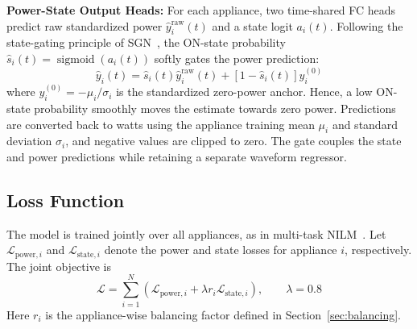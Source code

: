 \documentclass[journal]{IEEEtran}
\begin{document}
\textbf{Power-State Output Heads:}
For each appliance, two time-shared FC heads predict raw standardized power $\hat y_i^{\mathrm{raw}}(t)$ and a state logit $a_i(t)$. Following the state-gating principle of SGN~\cite{shin2019sgn}, the ON-state probability $\hat s_i(t)=\operatorname{sigmoid}(a_i(t))$ softly gates the power prediction:
\begin{equation}
\hat y_i(t)=\hat s_i(t)\hat y_i^{\mathrm{raw}}(t)
+[1-\hat s_i(t)]y_i^{(0)}
\label{eq:soft-power-gate}
\end{equation}
where $y_i^{(0)}=-\mu_i/\sigma_i$ is the standardized zero-power anchor. Hence, a low ON-state probability smoothly moves the estimate towards zero power. Predictions are converted back to watts using the appliance training mean $\mu_i$ and standard deviation $\sigma_i$, and negative values are clipped to zero. The gate couples the state and power predictions while retaining a separate waveform regressor.

\subsection{Loss Function}
\label{sec:loss}

The model is trained jointly over all appliances, as in multi-task NILM~\cite{faustine2020unet,xiong2024matnilm,sun2025transfer}. Let $\mathcal{L}_{\mathrm{power},i}$ and $\mathcal{L}_{\mathrm{state},i}$ denote the power and state losses for appliance $i$, respectively. The joint objective is
\begin{equation}
\mathcal{L}=\sum_{i=1}^{N}\left(
\mathcal{L}_{\mathrm{power},i}
+\lambda r_i\mathcal{L}_{\mathrm{state},i}
\right),
\qquad \lambda=0.8
\label{eq:loss}
\end{equation}
Here $r_i$ is the appliance-wise balancing factor defined in Section~\ref{sec:balancing}.
\end{document}
